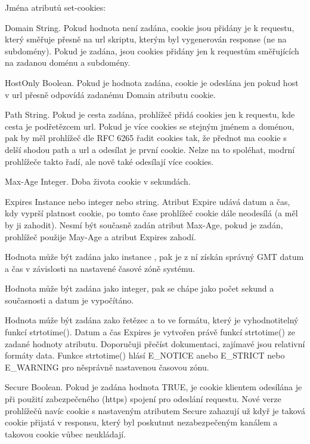 Jména atributů set-\/cookies\+: 
\begin{DoxyItemize}
\item \textquotesingle{}Domain\textquotesingle{} String. Pokud hodnota není zadána, cookie jsou přidány je k requestu, který směřuje přesně na url skriptu, kterým byl vygenerován response (ne na subdomény). Pokud je zadána, jsou cookies přidány jen k requestům směřujících na zadanou doménu a subdomény. 
\item \textquotesingle{}Host\+Only\textquotesingle{} Boolean. Pokud je hodnota zadána, cookie je odeslána jen pokud host v url přesně odpovídá zadanému Domain atributu cookie.  
\item \textquotesingle{}Path\textquotesingle{} String. Pokud je cesta zadána, prohlížeč přidá cookies jen k requestu, kde cesta je podřetězcem url. Pokud je více cookies se stejným jménem a doménou, pak by měl prohlížeč dle R\+FC 6265 řadit cookies tak, že přednot ma cookie s delší shodou path a url a odesílat je první cookie. Nelze na to spoléhat, modrní prohlížeče takto řadí, ale nově také odesílají více cookies. 
\item \textquotesingle{}Max-\/\+Age\textquotesingle{} Integer. Doba života cookie v sekundách. 
\item \textquotesingle{}Expires\textquotesingle{} Instance  nebo integer nebo string. Atribut Expire udává datum a čas, kdy vyprší platnost cookie, po tomto čase prohlížeč cookie dále neodesílá (a měl by ji zahodit). Nesmí být současně zadán atribut Max-\/\+Age, pokud je zadán, prohlížeč použije May-\/\+Age a atribut Expires zahodí. 
\begin{DoxyItemize}
\item Hodnota může být zadána jako instance , pak je z ní získán správný G\+MT datum a čas v závislosti na nastavené časové zóně systému.  
\item Hodnota může být zadána jako integer, pak se chápe jako počet sekund a současnosti a datum je vypočítáno.  
\item Hodnota múže být zadána zako řetězec a to ve formátu, který je vyhodnotitelný funkcí strtotime(). Datum a čas Expires je vytvořen právě funkcí strtotime() ze zadané hodnoty atributu. Doporučuji přečíst dokumentaci, zajímavé jsou relativní formáty data. Funkce strtotime() hlásí E\+\_\+\+N\+O\+T\+I\+CE anebo E\+\_\+\+S\+T\+R\+I\+CT nebo E\+\_\+\+W\+A\+R\+N\+I\+NG pro něsprávně nastavenou časovou zónu. 
\end{DoxyItemize}
\item \textquotesingle{}Secure\textquotesingle{} Boolean. Pokud je zadána hodnota T\+R\+UE, je cookie klientem odesílána je při použití zabezpečeného (https) spojení pro odeslání requestu. Nové verze prohlížečů navíc cookie s nastaveným atributem Secure zahazují už kdyř je taková cookie přijatá v responsu, který byl poskutnut nezabezpečeným kanálem a takovou cookie vůbec neukládají. 

\end{DoxyItemize}
